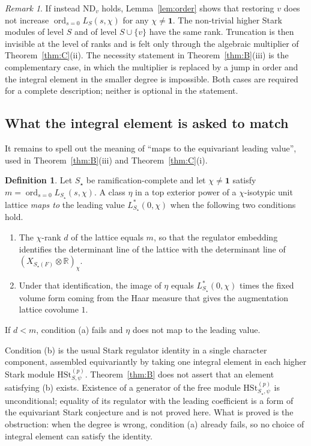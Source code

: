 \documentclass[11pt]{article}
\theoremstyle{plain}
\theoremstyle{definition}
\newtheorem{definition}[theorem]{Definition}
\theoremstyle{remark}
\newtheorem{remark}[theorem]{Remark}
\newcommand{\R}{\mathbb{R}}
\newcommand{\ord}{\operatorname{ord}}
\newcommand{\triv}{\mathbf{1}}
\newcommand{\HSt}{\mathrm{HSt}}
\begin{document}
\begin{remark}
\label{rem:nd-ok}
If instead $\mathrm{ND}_v$ holds, Lemma~\ref{lem:order} shows that restoring $v$ does not increase $\ord_{s=0}L_S(s,\chi)$ for any $\chi\neq\triv$.
The non-trivial higher Stark modules of level $S$ and of level $S\cup\{v\}$ have the same rank.
Truncation is then invisible at the level of ranks and is felt only through the algebraic multiplier of Theorem~\ref{thm:C}(ii).
The necessity statement in Theorem~\ref{thm:B}(iii) is the complementary case, in which the multiplier is replaced by a jump in order and the integral element in the smaller degree is impossible.
Both cases are required for a complete description; neither is optional in the statement.
\end{remark}

\subsection{What the integral element is asked to match}

It remains to spell out the meaning of ``maps to the equivariant leading value'', used in Theorem~\ref{thm:B}(iii) and Theorem~\ref{thm:C}(i).

\begin{definition}
\label{def:maps}
Let $S_{\star}$ be ramification-complete and let $\chi\neq\triv$ satisfy $m=\ord_{s=0}L_{S_{\star}}(s,\chi)$.
A class $\eta$ in a top exterior power of a $\chi$-isotypic unit lattice \emph{maps to} the leading value $L_{S_{\star}}^{*}(0,\chi)$ when the following two conditions hold.
\begin{enumerate}[label=\textup{(\alph*)}]
\item The $\chi$-rank $d$ of the lattice equals $m$, so that the regulator embedding identifies the determinant line of the lattice with the determinant line of $(X_{S_{\star}(F)}\otimes\R)_{\chi}$.
\item Under that identification, the image of $\eta$ equals $L_{S_{\star}}^{*}(0,\chi)$ times the fixed volume form coming from the Haar measure that gives the augmentation lattice covolume $1$.
\end{enumerate}
If $d<m$, condition (a) fails and $\eta$ does not map to the leading value.
\end{definition}

Condition (b) is the usual Stark regulator identity in a single character component, assembled equivariantly by taking one integral element in each higher Stark module $\HSt_{S,\psi}^{(p)}$.
Theorem~\ref{thm:B} does not assert that an element satisfying (b) exists.
Existence of a generator of the free module $\HSt_{S_{\star},\psi}^{(p)}$ is unconditional; equality of its regulator with the leading coefficient is a form of the equivariant Stark conjecture and is not proved here.
What is proved is the obstruction: when the degree is wrong, condition (a) already fails, so no choice of integral element can satisfy the identity.
\end{document}

